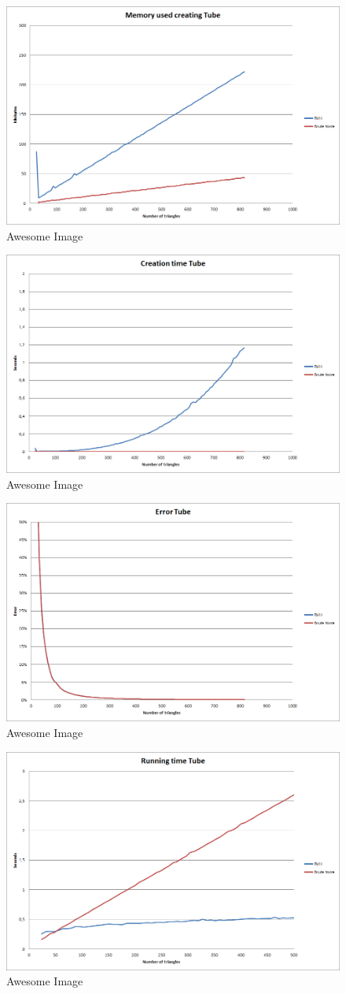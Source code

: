 \documentclass[11pt,twoside,a4paper]{report}
\begin{document}
\begin{figure}[h] \centering \includegraphics[width=0.45\linewidth]{images/chart_tube_creation_memory}
    \caption{Awesome Image} \label{fig:awesome_image1} \end{figure}
\begin{figure}[h] \centering \includegraphics[width=0.45\linewidth]{images/chart_tube_creation_time}
    \caption{Awesome Image} \label{fig:awesome_image1} \end{figure}
\begin{figure}[h] \centering \includegraphics[width=0.45\linewidth]{images/chart_tube_error}
    \caption{Awesome Image} \label{fig:awesome_image1} \end{figure}
\begin{figure}[h] \centering \includegraphics[width=0.45\linewidth]{images/chart_tube_running_time}
    \caption{Awesome Image} \label{fig:awesome_image1} \end{figure}
\end{document}

